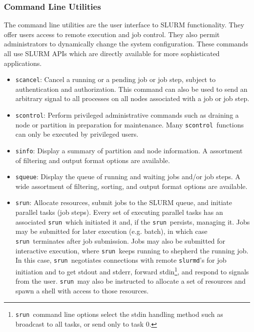 \documentclass{article}
\newcommand{\srun}{{\tt srun}}
\newcommand{\scontrol}{{\tt scontrol}}
\begin{document}
\subsubsection{Command Line Utilities}

The command line utilities are the user interface to SLURM functionality.
They offer users access to remote execution and job control. They also 
permit administrators to dynamically change the system configuration. 
These commands all use SLURM APIs which are directly available for 
more sophisticated applications.

\begin{itemize}
\item {\tt scancel}: Cancel a running or a pending job or job step, 
subject to authentication and authorization. This command can also 
be used to send an arbitrary signal to all processes on all nodes 
associated with a job or job step.

\item {\tt scontrol}: Perform privileged administrative commands
such as draining a node or partition in preparation for maintenance. 
Many \scontrol\ functions can only be executed by privileged users.

\item {\tt sinfo}: Display a summary of partition and node information.
A assortment of filtering and output format options are available.

\item {\tt squeue}: Display the queue of running and waiting jobs 
and/or job steps. A wide assortment of filtering, sorting, and output 
format options are available.

\item {\tt srun}: Allocate resources, submit jobs to the SLURM queue,
and initiate parallel tasks (job steps). 
Every set of executing parallel tasks has an associated \srun\ which 
initiated it and, if the \srun\ persists, managing it. 
Jobs may be submitted for later execution (e.g. batch), in which case 
\srun\ terminates after job submission. 
Jobs may also be submitted for interactive execution, where \srun\ keeps 
running to shepherd the running job. In this case, 
\srun\ negotiates connections with remote {\tt slurmd}'s 
for job initiation and to
get stdout and stderr, forward stdin\footnote{\srun\ command
line options select the stdin handling method such as broadcast to all
tasks, or send only to task 0.}, and respond to signals from the user.
\srun\ may also be instructed to allocate a set of resources and
spawn a shell with access to those resources.

\end{itemize}
\end{document}
